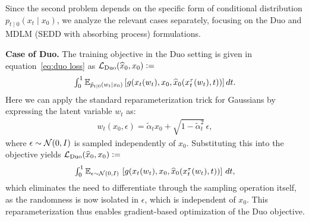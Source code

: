 Since the second problem depends on the specific form of conditional distribution $p_{t \mid 0}(x_t \mid x_0)$, we analyze the relevant cases separately, focusing on the Duo and MDLM (SEDD with absorbing process) formulations.


\textbf{Case of Duo.} The training objective in the Duo setting is given in equation~\eqref{eq:duo loss} as $\mathcal{L}_{\text{Duo}}(\widehat{x}_0, x_0)\vcentcolon=$
\begin{gather}
  \textstyle \int_0^1 \mathbb{E}_{\tilde{p}_{t\mid 0}(w_t\mid x_0)} \left[g(x_t(w_t),x_0, \widehat{x}_0(x_t^{\tau}(w_t), t))\right]dt. \nonumber
\end{gather}
Here we can apply the standard reparameterization trick for Gaussians by expressing the latent variable $w_t$ as:
\begin{gather}
  \textstyle w_t(x_0, \epsilon) = \tilde{\alpha}_t x_0 + \sqrt{1 - \tilde{\alpha}_t^2} \, \epsilon,
\end{gather}
where $\epsilon \sim \mathcal{N}(0, I)$ is sampled independently of $x_0$. Substituting this into the objective yields $\mathcal{L}_{\text{Duo}}(\widehat{x}_0, x_0)\vcentcolon=$
\begin{gather}
  \textstyle \int_0^1 \mathbb{E}_{\epsilon \sim \mathcal{N}(0, I)} \, \left[g(x_t(w_t),x_0, \widehat{x}_0(x_t^{\tau}(w_t), t))\right] \, dt,
\end{gather}
which eliminates the need to differentiate through the sampling operation itself, as the randomness is now isolated in $\epsilon$, which is independent of $x_0$. This reparameterization thus enables gradient-based optimization of the Duo objective.

